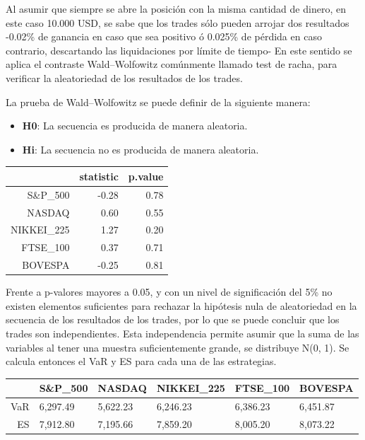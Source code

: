 \documentclass[a4paper,12pt]{Latex/Classes/PhDthesisPSnPDF}
\begin{document}
Al asumir que siempre se abre la posición con la misma cantidad de dinero, en este caso 10.000 USD, se sabe que los trades sólo pueden arrojar dos resultados -0.02\% de ganancia en caso que sea positivo ó 0.025\% de pérdida en caso contrario, descartando las liquidaciones por límite de tiempo- En este sentido se aplica el contraste Wald–Wolfowitz comúnmente llamado test de racha, para verificar la aleatoriedad de los resultados de los trades.

La prueba de Wald–Wolfowitz se puede definir de la siguiente manera:

\begin{itemize}
\item \textbf{H0}: La secuencia es producida de manera aleatoria.
\item \textbf{Hi}: La secuencia no es producida de manera aleatoria.
\end{itemize}

 
\begin{center}
\begin{table}[ht]
\centering
\begin{tabular}{rrr}
  \hline
 & statistic & p.value \\ 
  \hline
S\&P\_500 & -0.28 & 0.78 \\ 
  NASDAQ & 0.60 & 0.55 \\ 
  NIKKEI\_225 & 1.27 & 0.20 \\ 
  FTSE\_100 & 0.37 & 0.71 \\ 
  BOVESPA & -0.25 & 0.81 \\ 
   \hline
\end{tabular}
\end{table}\end{center}

Frente a p-valores mayores a 0.05, y con un nivel de significación del 5\% no existen elementos suficientes para rechazar la hipótesis nula de aleatoriedad en la secuencia de los resultados de los trades, por lo que se puede concluir que los trades son independientes. Esta independencia permite asumir que la suma de las variables al tener una muestra suficientemente grande, se distribuye N(0, 1). Se calcula entonces el VaR y ES para cada una de las estrategias.


\begin{center}
\begin{table}[ht]
\centering
\begin{tabular}{rlllll}
  \hline
 & S\&P\_500 & NASDAQ & NIKKEI\_225 & FTSE\_100 & BOVESPA \\ 
  \hline
VaR & 6,297.49 & 5,622.23 & 6,246.23 & 6,386.23 & 6,451.87 \\ 
  ES & 7,912.80 & 7,195.66 & 7,859.20 & 8,005.20 & 8,073.22 \\ 
   \hline
\end{tabular}
\end{table}\end{center}
  
\end{document}
